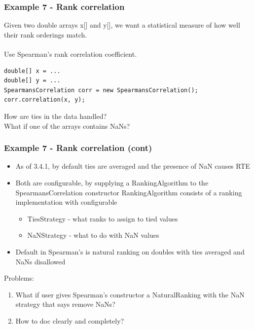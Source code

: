 \documentclass[14pt,mathserif]{beamer}
\begin{document}
\begin{frame}[fragile]
  \frametitle{Example 7 - Rank correlation}

Given two double arrays x[] and y[], we want a statistical measure of how well their rank
orderings match. \\ ~ \\
Use Spearman's rank correlation coefficient.

\begin{verbatim}
double[] x = ...
double[] y = ...
SpearmansCorrelation corr = new SpearmansCorrelation();
corr.correlation(x, y);
\end{verbatim}

How are ties in the data handled? \\
What if one of the arrays contains NaNs?
\end{frame}

\begin{frame}
  \frametitle{Example 7 - Rank correlation (cont)}

\begin{small}
\begin{itemize}
\item As of 3.4.1, by default ties are averaged and the presence of NaN causes RTE
\item Both are configurable, by supplying a RankingAlgorithm to the SpearmansCorrelation
constructor
RankingAlgorithm consists of a ranking implementation with configurable
\begin{itemize}
  \item TiesStrategy - what ranks to assign to tied values
  \item NaNStrategy - what to do with NaN values
\end{itemize}
\item Default in Spearman's is natural ranking on doubles with ties averaged and NaNs disallowed
\end{itemize}
Problems: 
\begin{enumerate}
\item What if user gives Spearman's constructor a NaturalRanking with the NaN strategy
that says remove NaNs? 
\item How to doc clearly and completely?
\end{enumerate}
\end{small}
\end{frame}
\end{document}
